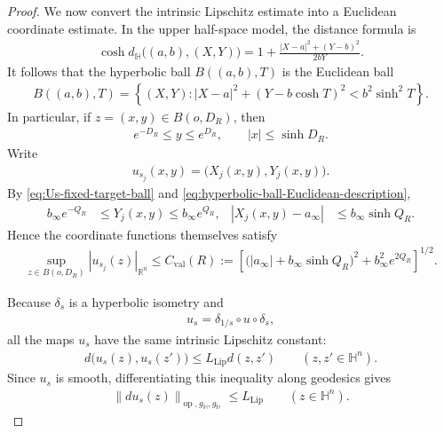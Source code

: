 \documentclass[11pt]{amsart}
\theoremstyle{plain}
\theoremstyle{plain}
\theoremstyle{plain}
\newcommand{\Hn}{\mathbb H^n}
\numberwithin{equation}{section}
\begin{document}
\begin{proof}
We now convert the intrinsic Lipschitz estimate into a Euclidean
coordinate estimate.  In the upper half-space model, the distance
formula is
\begin{align}
\cosh d_{\mathbb H}\bigl((a,b),(X,Y)\bigr)
=
1+\frac{|X-a|^2+(Y-b)^2}{2bY}.
\nonumber
\end{align}
It follows that the hyperbolic ball \(B((a,b),T)\) is the Euclidean
ball
\begin{align}
B((a,b),T)
=
\left\{(X,Y):
|X-a|^2+(Y-b\cosh T)^2<b^2\sinh^2T
\right\}.
\label{eq:hyperbolic-ball-Euclidean-description}
\end{align}
In particular, if \(z=(x,y)\in B(o,D_R)\), then
\begin{align}
e^{-D_R}\leq y\leq e^{D_R},
\qquad
|x|\leq\sinh D_R.
\label{eq:source-coordinate-bounds}
\end{align}
Write
\begin{align}
u_{s_j}(x,y)
=
\bigl(X_j(x,y),Y_j(x,y)\bigr).
\nonumber
\end{align}
By \eqref{eq:Us-fixed-target-ball} and
\eqref{eq:hyperbolic-ball-Euclidean-description},
\begin{align}
b_\infty e^{-Q_R}
&\leq Y_j(x,y)\leq b_\infty e^{Q_R},
&
|X_j(x,y)-a_\infty|
&\leq b_\infty\sinh Q_R.
\label{eq:target-coordinate-bounds}
\end{align}
Hence the coordinate functions themselves satisfy
\begin{align}
\sup_{z\in B(o,D_R)}
|u_{s_j}(z)|_{\mathbb R^{n}}
\leq C_{\mathrm{val}}(R):=
\left[
\bigl(|a_\infty|+b_\infty\sinh Q_R\bigr)^2
+b_\infty^2e^{2Q_R}
\right]^{1/2}.
\label{eq:Us-coordinate-C0-bound}
\end{align}


Because \(\delta_s\) is a hyperbolic isometry and
\begin{align}
u_s=\delta_{1/s}\circ u\circ\delta_s,
\nonumber
\end{align}
all the maps \(u_s\) have the same intrinsic Lipschitz constant:
\begin{align}
d\bigl(u_s(z),u_s(z')\bigr)
\leq L_{\mathrm{Lip}}d(z,z')
\qquad(z,z'\in\Hn).
\nonumber
\end{align}
Since \(u_s\) is smooth, differentiating this inequality along
geodesics gives
\begin{align}
\lVert du_s(z)\rVert_{\operatorname{op},g_{\mathbb H},g_{\mathbb H}}
\leq L_{\mathrm{Lip}}
\qquad(z\in\Hn).
\label{eq:Us-intrinsic-differential-bound}
\end{align}


\end{proof}
\end{document}

